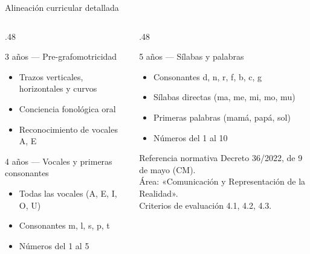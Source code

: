 \documentclass[aspectratio=169, 11pt]{beamer}
\begin{document}
\begin{frame}{Alineación curricular detallada}
  \small
  \begin{columns}[T]
    \begin{column}{.48\textwidth}
      \begin{exampleblock}{3 años — Pre-grafomotricidad}
        \begin{itemize}
          \item Trazos verticales, horizontales y curvos
          \item Conciencia fonológica oral
          \item Reconocimiento de vocales A, E
        \end{itemize}
      \end{exampleblock}
      \vspace{4pt}
      \begin{exampleblock}{4 años — Vocales y primeras consonantes}
        \begin{itemize}
          \item Todas las vocales (A, E, I, O, U)
          \item Consonantes m, l, s, p, t
          \item Números del 1 al 5
        \end{itemize}
      \end{exampleblock}
    \end{column}
    \begin{column}{.48\textwidth}
      \begin{exampleblock}{5 años — Sílabas y palabras}
        \begin{itemize}
          \item Consonantes d, n, r, f, b, c, g
          \item Sílabas directas (ma, me, mi, mo, mu)
          \item Primeras palabras (mamá, papá, sol)
          \item Números del 1 al 10
        \end{itemize}
      \end{exampleblock}
      \vspace{4pt}
      \begin{block}{Referencia normativa}
        \footnotesize
        Decreto 36/2022, de 9 de mayo (CM).\\
        Área: «Comunicación y Representación de la Realidad».\\
        Criterios de evaluación 4.1, 4.2, 4.3.
      \end{block}
    \end{column}
  \end{columns}
\end{frame}
\end{document}
